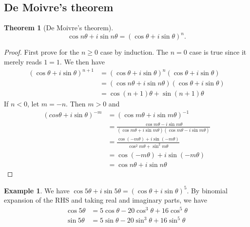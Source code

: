 \documentclass[a4paper]{article}
\theoremstyle{definition}
\newtheorem*{thm}{Theorem}
\newtheorem*{eg}{Example}
\begin{document}
\subsection{De Moivre's theorem}
\begin{thm}[De Moivre's theorem]
\[
\cos n\theta + i\sin n\theta = (\cos\theta + i\sin\theta)^n.
\]
\end{thm}
\begin{proof}
  First prove for the $n \geq 0$ case by induction. The $n = 0$ case is true since it merely reads $1 = 1$. We then have
  \begin{align*}
    (\cos\theta + i\sin\theta)^{n + 1} &= (\cos\theta + i\sin\theta)^n (\cos\theta + i\sin\theta)\\
    &= (\cos n\theta + i\sin n\theta )(\cos\theta + i\sin\theta)\\
    &= \cos(n+1)\theta + \sin(n+1)\theta
  \end{align*}
  If $n < 0$, let $m = -n$. Then $m > 0$ and
  \begin{align*}
    (cos\theta + i\sin\theta)^{-m} &= (\cos m\theta + i\sin m\theta)^{-1}\\
    &= \frac{\cos m\theta - i\sin m\theta}{(\cos m\theta + i\sin m\theta)(\cos m\theta - i\sin m\theta)}\\
    &= \frac{\cos (-m\theta) + i\sin (-m\theta)}{\cos^2 m\theta + \sin^2 m\theta}\\
    &= \cos (-m\theta) + i\sin (-m\theta)\\
    &= \cos n\theta + i\sin n\theta
  \end{align*}
\end{proof}

\begin{eg}
  We have $\cos 5\theta + i\sin5\theta  = (\cos\theta + i\sin\theta)^5$. By binomial expansion of the RHS and taking real and imaginary parts, we have
  \begin{align*}
    \cos 5\theta &= 5\cos\theta - 20\cos^3\theta + 16\cos^5\theta\\
    \sin 5\theta &= 5\sin\theta - 20\sin^3\theta + 16\sin^5\theta
  \end{align*}
\end{eg}
\end{document}
